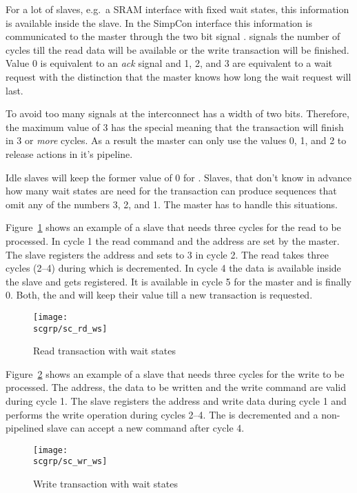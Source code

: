 For a lot of slaves, e.g.\ a SRAM interface with fixed wait states,
this information is available inside the slave. In the SimpCon
interface this information is communicated to the master through the
two bit signal .  signals the number
of cycles till the read data will be available or the write
transaction will be finished. Value 0 is equivalent to an \emph{ack}
signal and 1, 2, and 3 are equivalent to a wait request with the
distinction that the master knows how long the wait request will
last.

To avoid too many signals at the interconnect  has a
width of two bits. Therefore, the maximum value of 3 has the special
meaning that the transaction will finish in 3 or \emph{more} cycles.
As a result the master can only use the values 0, 1, and 2 to
release actions in it's pipeline.

Idle slaves will keep the former value of 0 for .
Slaves, that don't know in advance how many wait states are need for
the transaction can produce sequences that omit any of the numbers
3, 2, and 1. The master has to handle this situations.

Figure~\ref{fig:sc:rd:ws} shows an example of a slave that needs
three cycles for the read to be processed. In cycle 1 the read
command and the address are set by the master. The slave registers
the address and sets  to 3 in cycle 2. The read takes
three cycles (2--4) during which  is decremented. In
cycle 4 the data is available inside the slave and gets registered.
It is available in cycle 5 for the master and  is
finally 0. Both, the  and  will keep
their value till a new transaction is requested.

\begin{figure}
    \centering
    \texttt{[image: \\scgrp/sc\_rd\_ws]}
    \caption{Read transaction with wait states}
    \label{fig:sc:rd:ws}
\end{figure}


Figure~\ref{fig:sc:wr:ws} shows an example of a slave that needs
three cycles for the write to be processed. The address, the data to
be written and the write command are valid during cycle 1. The slave
registers the address and write data during cycle 1 and performs the
write operation during cycles 2--4. The  is
decremented and a non-pipelined slave can accept a new command after
cycle 4.

\begin{figure}
    \centering
    \texttt{[image: \\scgrp/sc\_wr\_ws]}
    \caption{Write transaction with wait states}
    \label{fig:sc:wr:ws}
\end{figure}



